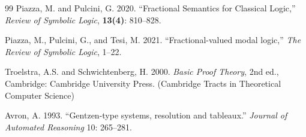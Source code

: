 \documentclass[12pt,a4paper,reqno]{amsart}
\theoremstyle{definition}
\begin{document}
\begin{thebibliography}{99}
Piazza, M. and Pulcini, G. 2020. “Fractional Semantics for Classical Logic,” \textit{Review of Symbolic Logic}, \textbf{13(4)}: 810–828.

Piazza, M., Pulcini, G., and Tesi, M. 2021. “Fractional-valued modal logic,” \textit{The Review of Symbolic Logic}, 1–22.



Troelstra, A.S. and Schwichtenberg, H. 2000. \textit{Basic Proof Theory}, 2nd ed., Cambridge: Cambridge University Press. (Cambridge Tracts in Theoretical Computer Science)

Avron, A. 1993. ``Gentzen-type systems, resolution and tableaux.'' \textit{Journal of Automated Reasoning} 10: 265--281.

\end{thebibliography}
\end{document}
